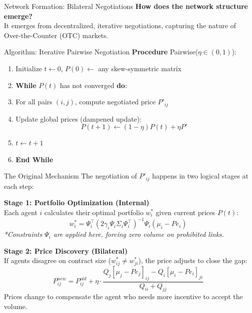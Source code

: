 \documentclass[aspectratio=169]{beamer}
\begin{document}

\begin{frame}{Network Formation: Bilateral Negotiations}
    \textbf{How does the network structure emerge?} \\
    It emerges from decentralized, iterative negotiations, capturing the nature of Over-the-Counter (OTC) markets.
    
    \begin{block}{Algorithm: Iterative Pairwise Negotiation}
        \textbf{Procedure} Pairwise($\eta \in (0,1)$):
        \begin{enumerate}
            \item Initialize $t \leftarrow 0$, $P(0) \leftarrow$ any skew-symmetric matrix
            \item \textbf{While} $P(t)$ has not converged \textbf{do}:
            \item \quad For all pairs $(i,j)$, compute negotiated price $P'_{ij}$
            \item \quad Update global prices (dampened update):
            $$P(t+1) \leftarrow (1 - \eta)P(t) + \eta P'$$
            \item \quad $t \leftarrow t+1$
            \item \textbf{End While}
        \end{enumerate}
    \end{block}
    
   
\end{frame}

\begin{frame}{The Original Mechanism}
    The negotiation of $P'_{ij}$ happens in two logical stages at each step:
    
    \vspace{0.3cm}
    \textbf{Stage 1: Portfolio Optimization (Internal)} \\
    Each agent $i$ calculates their optimal portfolio $w_i^*$ given current prices $P(t)$:
    \begin{equation}
        w_i^* = \Psi_i^\top (2\gamma_i \Psi_i \Sigma_i \Psi_i^\top)^{-1} \Psi_i (\mu_i - P e_i)
    \end{equation}
    \tiny{\textit{*Constraints $\Psi_i$ are applied here, forcing zero volume on prohibited links.}}
    
    \vspace{0.3cm}
    \normalsize
    \textbf{Stage 2: Price Discovery (Bilateral)} \\
    If agents disagree on contract size ($w_{ij}^* \neq w_{ji}^*$), the price adjusts to close the gap:
    \begin{equation}
        P_{ij}^{new} = P_{ij}^{old} + \eta \cdot \frac{Q_j[\mu_j - P e_j]_{ij} - Q_i[\mu_i - P e_i]_{ji}}{Q_{ii} + Q_{jj}}
    \end{equation}
    \vspace{0.1cm}
    \small{Prices change to compensate the agent who needs more incentive to accept the volume.}
\end{frame}
\end{document}
